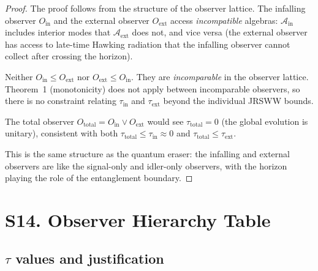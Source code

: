 \documentclass[aps,prd,preprint,superscriptaddress,longbibliography]{revtex4-2}
\newcommand{\tauasym}{\tau}
\newcommand{\algO}{\mathcal{A}}
\begin{document}
\begin{proof}
The proof follows from the structure of the observer lattice.  The
infalling observer $O_{\mathrm{in}}$ and the external observer
$O_{\mathrm{ext}}$ access \emph{incompatible} algebras:
$\algO_{\mathrm{in}}$ includes interior modes that
$\algO_{\mathrm{ext}}$ does not, and vice versa (the external
observer has access to late-time Hawking radiation that the
infalling observer cannot collect after crossing the horizon).

Neither $O_{\mathrm{in}} \leq O_{\mathrm{ext}}$ nor
$O_{\mathrm{ext}} \leq O_{\mathrm{in}}$.  They are
\emph{incomparable} in the observer lattice.  Theorem~1
(monotonicity) does not apply between incomparable observers, so
there is no constraint relating $\tauasym_{\mathrm{in}}$ and
$\tauasym_{\mathrm{ext}}$ beyond the individual JRSWW bounds.

The total observer $O_{\mathrm{total}} = O_{\mathrm{in}} \vee
O_{\mathrm{ext}}$ would see $\tauasym_{\mathrm{total}} = 0$
(the global evolution is unitary), consistent with both
$\tauasym_{\mathrm{total}} \leq \tauasym_{\mathrm{in}} \approx 0$
and $\tauasym_{\mathrm{total}} \leq \tauasym_{\mathrm{ext}}$.

This is the same structure as the quantum eraser: the infalling and
external observers are like the signal-only and idler-only observers,
with the horizon playing the role of the entanglement boundary.
\end{proof}

\section{S14. Observer Hierarchy Table}
\label{sec:hierarchy}

\subsection{$\tauasym$ values and justification}
\end{document}
